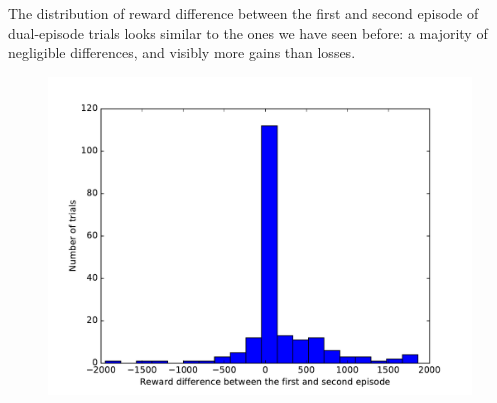 \documentclass[letterpaper]{article}
\begin{document}
The distribution of reward difference between the first and second episode
of dual-episode trials looks similar to the ones we have seen before: a
majority of negligible differences, and visibly more gains than losses.
\begin{figure}
	\centering
	\caption{}
	\label{fig:distrib_mask}
\end{figure}

\begin{figure}[h]
	\centering
	\includegraphics[width=\linewidth]{fig/reward_diff_mask.pdf}
	\caption{}
	\label{fig:reward_diff_mask}
\end{figure}
\end{document}
